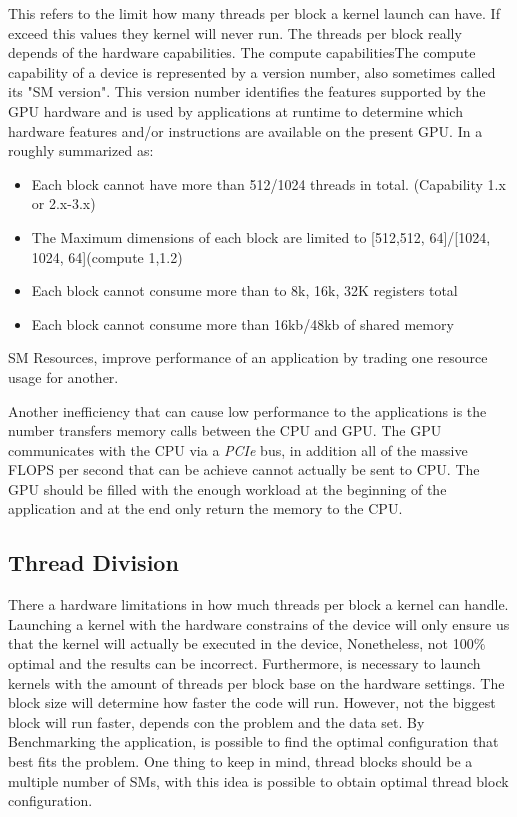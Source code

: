 This refers to the limit how many threads per block a kernel launch can have. If exceed this values they kernel will never run. The threads per block really depends of the hardware capabilities.  The compute capabilitiesThe compute capability of a device is represented by a version number, also sometimes called its "SM version". This version number identifies the features supported by the GPU hardware and is used by applications at runtime to determine which hardware features and/or instructions are available on the present GPU.\cite{tool} In a roughly summarized as:

\begin{itemize}
\item Each block cannot have more than 512/1024 threads in total. (Capability 1.x or 2.x-3.x)
\item The Maximum dimensions of each block are limited to [512,512, 64]/[1024, 1024, 64](compute 1,1.2)
\item Each block cannot consume more than to 8k, 16k, 32K registers total
\item Each block cannot consume more than 16kb/48kb of shared memory
\end{itemize}

SM Resources, improve performance of an application by trading one resource usage for another.  \cite{practices}

Another inefficiency that can cause low performance to the applications is the number transfers memory calls between the CPU and GPU. The GPU communicates with the CPU via a \textit{PCIe} bus, in addition all of the massive FLOPS per second that can be achieve cannot actually be sent to CPU. The GPU should be filled with the enough workload at the beginning of the application and at the end only return the memory to the CPU.

\subsection{Thread Division}

There a hardware limitations in how much threads per block a kernel can handle. Launching a kernel with the hardware constrains of the device will only ensure us that the kernel will actually be executed in the device, Nonetheless, not 100$\%$ optimal and the results can be incorrect. Furthermore, is necessary to launch kernels with the amount of threads per block base on the hardware settings. The block size will determine how faster the code will run. However, not the biggest block will run faster, depends con the problem and the data set. By Benchmarking the application, is possible to find the optimal configuration that best fits the problem. One thing to keep in mind, thread blocks should be a multiple number of SMs, with this idea is possible to obtain optimal thread block configuration.

